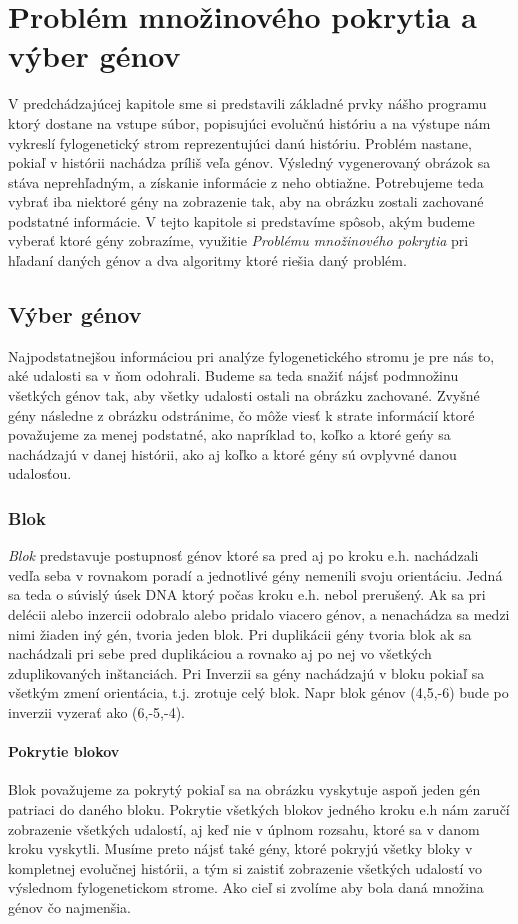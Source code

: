 \chapter{Problém množinového pokrytia a výber génov}
V predchádzajúcej kapitole sme si predstavili základné prvky nášho programu ktorý dostane na vstupe súbor, 
popisujúci evolučnú históriu a na výstupe nám vykreslí fylogenetický strom reprezentujúci danú históriu.
Problém nastane, pokiaľ v histórii nachádza príliš veľa génov. Výsledný vygenerovaný obrázok sa stáva neprehľadným, 
a získanie informácie z neho obtiažne. 
Potrebujeme teda vybrať iba niektoré gény na zobrazenie tak, aby na obrázku zostali zachované podstatné informácie.
V tejto kapitole si predstavíme spôsob, akým budeme vyberať ktoré gény zobrazíme,
využitie \emph{Problému množinového pokrytia} pri hľadaní daných génov a dva algoritmy ktoré riešia daný problém.
\section{Výber génov}
Najpodstatnejšou informáciou pri analýze fylogenetického stromu je pre nás to, aké udalosti sa v ňom odohrali. 
Budeme sa teda snažiť nájsť podmnožinu všetkých génov tak, aby všetky udalosti ostali na obrázku zachované.
Zvyšné gény následne z obrázku odstránime, čo môže viesť k strate informácií ktoré považujeme za menej podstatné, 
ako napríklad to, koľko a ktoré geńy sa nachádzajú v danej histórii, ako aj koľko a ktoré gény sú ovplyvné danou udalosťou.
\subsection{Blok}
\emph{Blok} predstavuje postupnosť génov ktoré sa pred aj po kroku e.h. nachádzali vedľa seba v rovnakom poradí a jednotlivé gény nemenili svoju orientáciu. Jedná sa teda o súvislý
úsek DNA ktorý počas kroku e.h. nebol prerušený.
Ak sa pri delécii alebo inzercii odobralo alebo pridalo viacero génov, a nenachádza sa medzi nimi žiaden iný gén, tvoria jeden blok.
Pri duplikácii gény tvoria blok ak sa nachádzali pri sebe pred duplikáciou a rovnako aj po nej vo všetkých zduplikovaných inštanciách.
Pri Inverzii sa gény nachádzajú v bloku pokiaľ sa všetkým zmení orientácia, t.j. zrotuje celý blok.
Napr blok génov (4,5,-6) bude po inverzii vyzerať ako (6,-5,-4).
\subsubsection{Pokrytie blokov}
Blok považujeme za pokrytý pokiaľ sa na obrázku vyskytuje aspoň jeden gén patriaci do daného bloku.
Pokrytie všetkých blokov jedného kroku e.h nám zaručí zobrazenie všetkých udalostí, aj keď nie v úplnom rozsahu,
ktoré sa v danom kroku vyskytli.
Musíme preto nájsť také gény, ktoré pokryjú všetky bloky v kompletnej evolučnej histórii,
a tým si zaistiť zobrazenie všetkých udalostí vo výslednom fylogenetickom strome. 
Ako cieľ si zvolíme aby bola daná množina génov čo najmenšia.
